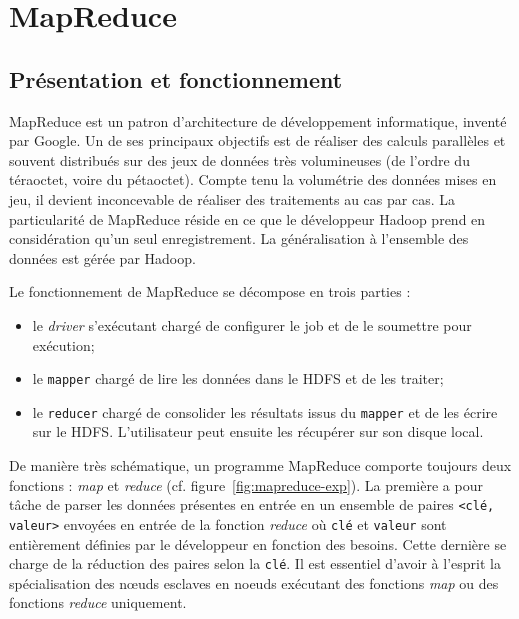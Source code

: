\section{MapReduce}
\subsection{Présentation et fonctionnement}

\par MapReduce est un patron d'architecture de développement informatique, inventé par Google. Un de ses principaux objectifs est de réaliser des calculs parallèles et souvent distribués sur des jeux de données très volumineuses (de l'ordre du téraoctet, voire du pétaoctet). Compte tenu la volumétrie des données mises en jeu, il devient inconcevable de réaliser des traitements au cas par cas. La particularité de MapReduce réside en ce que le développeur Hadoop prend en considération qu'un seul enregistrement. La généralisation à l'ensemble des données est gérée par Hadoop.

\par Le fonctionnement de MapReduce se décompose en trois parties :
\begin{itemize}
\item le \textit{driver} s'exécutant chargé de configurer le job et de le soumettre pour exécution;
\item le \texttt{mapper} chargé de lire les données dans le HDFS et de les traiter;
\item le \texttt{reducer} chargé de consolider les résultats issus du \texttt{mapper} et de les écrire sur le HDFS. L'utilisateur peut ensuite les récupérer sur son disque local.
\end{itemize}

\par De manière très schématique, un programme MapReduce comporte toujours deux fonctions : \textit{map} et \textit{reduce} (cf. figure~\ref{fig:mapreduce-exp}). La première a pour tâche de parser les données présentes en entrée en un ensemble de paires \texttt{<clé, valeur>} envoyées en entrée de la fonction \textit{reduce} où \texttt{clé} et \texttt{valeur} sont entièrement définies par le développeur en fonction des besoins. Cette dernière se charge de la réduction des paires selon la \texttt{clé}. Il est essentiel d'avoir à l'esprit la spécialisation des n\oe{}uds esclaves en noeuds exécutant des fonctions \textit{map} ou des fonctions \textit{reduce} uniquement.

